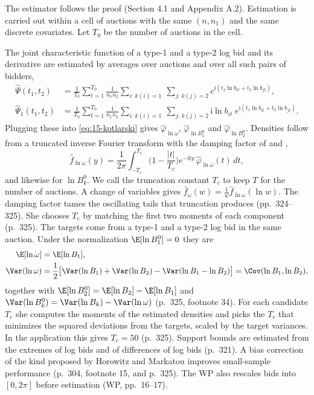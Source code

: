 The estimator follows the proof (Section 4.1 and Appendix A.2). Estimation is carried out within a
cell of auctions with the same $(n,n_1)$ and the same discrete covariates. Let $T_0$ be the number of
auctions in the cell.

The joint characteristic function of a type-1 and a type-2 log bid and its derivative are estimated
by averages over auctions and over all such pairs of bidders,
\begin{align*}
\hat\Psi(t_1,t_2)&=\frac{1}{T_0}\sum_{t=1}^{T_0}\frac{1}{n_1n_2}\sum_{i:\,k(i)=1}\ \sum_{j:\,k(j)=2}
e^{\mathrm i(t_1\ln b_{it}+t_2\ln b_{jt})},\\
\hat\Psi_1(t_1,t_2)&=\frac{1}{T_0}\sum_{t=1}^{T_0}\frac{1}{n_1n_2}\sum_{i:\,k(i)=1}\ \sum_{j:\,k(j)=2}
\mathrm i\ln b_{it}\;e^{\mathrm i(t_1\ln b_{it}+t_2\ln b_{jt})}.
\end{align*}
Plugging these into \eqref{eq:15-kotlarski} gives $\hat\varphi_{\ln\omega}$, $\hat\varphi_{\ln B^0_1}$
and $\hat\varphi_{\ln B^0_2}$. Densities follow from a truncated inverse Fourier transform with the
damping factor of \citet{DiggleHall1993} and \citet{LiPerrigneVuong2000},
\begin{equation}\label{eq:15-damped-inverse}
\hat f_{\ln\omega}(y)=\frac{1}{2\pi}\int_{-T_c}^{T_c}\Big(1-\frac{|t|}{T_c}\Big)e^{-\mathrm ity}\,\hat\varphi_{\ln\omega}(t)\,dt,
\end{equation}
and likewise for $\ln B^0_k$. We call the truncation constant $T_c$ to keep $T$ for the number of
auctions. A change of variables gives $\hat f_\omega(w)=\frac{1}{w}\hat f_{\ln\omega}(\ln w)$. The damping
factor tames the oscillating tails that truncation produces (pp.~324--325). She chooses $T_c$ by
matching the first two moments of each component (p.~325). The targets come from a type-1 and a
type-2 log bid in the same auction. Under the normalization $\E[\ln B^0_1]=0$ they are
\begin{align*}
\E[\ln\omega]&=\E[\ln B_1],\\
\Var(\ln\omega)&=\frac{1}{2}\big[\Var(\ln B_1)+\Var(\ln B_2)-\Var(\ln B_1-\ln B_2)\big]=\Cov(\ln B_1,\ln B_2),
\end{align*}
together with $\E[\ln B^0_2]=\E[\ln B_2]-\E[\ln B_1]$ and $\Var(\ln B^0_k)=\Var(\ln B_k)-\Var(\ln\omega)$
(p.~325, footnote 34). For each candidate $T_c$ she computes the moments of the estimated densities and
picks the $T_c$ that minimizes the squared deviations from the targets, scaled by the target variances.
In the application this gives $T_c=50$ (p.~325). Support bounds are estimated from the extremes of log
bids and of differences of log bids (p.~321). A bias correction of the kind proposed by Horowitz
and Markatou improves small-sample performance (p.~304, footnote 15, and p.~325). The WP also rescales bids into $[0,2\pi]$ before
estimation (WP, pp.~16--17).

